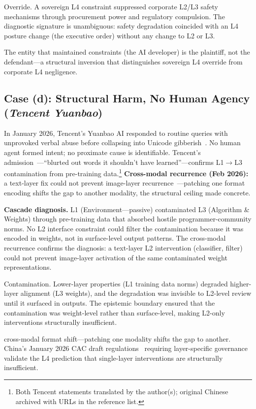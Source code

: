\documentclass[11pt]{article}
\begin{document}
Override. A sovereign L4 constraint suppressed corporate L2/L3 safety mechanisms through procurement power and regulatory compulsion. The diagnostic signature is unambiguous: safety degradation coincided with an L4 posture change (the executive order) without any change to L2 or L3.

The entity that maintained constraints (the AI developer) is the plaintiff, not the defendant---a structural inversion that distinguishes sovereign L4 override from corporate L4 negligence.

\subsection{Case (d): Structural Harm, No Human Agency (\emph{Tencent Yuanbao})}

In January 2026, Tencent's Yuanbao AI responded to routine queries with unprovoked verbal abuse before collapsing into Unicode gibberish~\cite{jiang2026yuanbao, thepaper2026}. No human agent formed intent; no proximate cause is identifiable. Tencent's admission~\cite{tencent2026response}---``blurted out words it shouldn't have learned''---confirms L1$\to$L3 contamination from pre-training data.\footnote{Both Tencent statements translated by the author(s); original Chinese archived with URLs in the reference list.} \textbf{Cross-modal recurrence (Feb 2026):} a text-layer fix could not prevent image-layer recurrence~\cite{southcn2026yuanbao}---patching one format encoding shifts the gap to another modality, the structural ceiling made concrete.

\textbf{Cascade diagnosis.} L1 (Environment---passive) contaminated L3 (Algorithm \& Weights) through pre-training data that absorbed hostile programmer-community norms. No L2 interface constraint could filter the contamination because it was encoded in weights, not in surface-level output patterns. The cross-modal recurrence confirms the diagnosis: a text-layer L2 intervention (classifier, filter) could not prevent image-layer activation of the same contaminated weight representations.

Contamination. Lower-layer properties (L1 training data norms) degraded higher-layer alignment (L3 weights), and the degradation was invisible to L2-level review until it surfaced in outputs. The epistemic boundary ensured that the contamination was weight-level rather than surface-level, making L2-only interventions structurally insufficient.

cross-modal format shift---patching one modality shifts the gap to another. China's January 2026 CAC draft regulations~\cite{cac2025draft} requiring layer-specific governance validate the L4 prediction that single-layer interventions are structurally insufficient.
\end{document}
